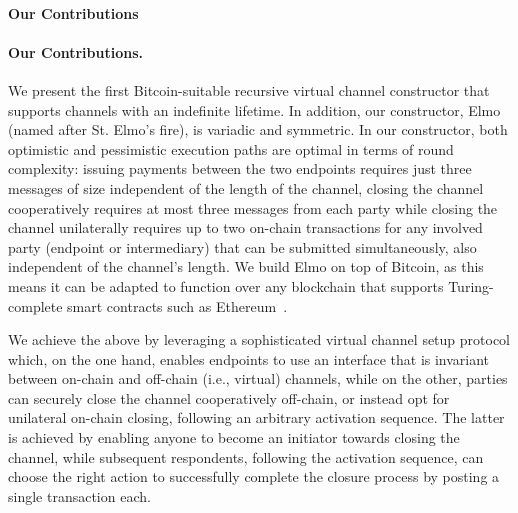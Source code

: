 \makeatletter%
%
  {\paragraph{Our Contributions}}%
  {\paragraph{Our Contributions.}}%
\makeatother%
 We present the first Bitcoin-suitable
recursive virtual channel constructor that supports channels
with an indefinite lifetime. In addition, our constructor, Elmo (named after St.
Elmo's fire), is variadic and symmetric. In our constructor, both optimistic and
pessimistic execution paths are optimal in terms of round complexity: issuing
payments between the two endpoints requires just three messages of size
independent of the length of the channel, closing the channel cooperatively
requires at most three messages from each party while
closing the channel unilaterally requires up to two on-chain transactions for
any involved party (endpoint or intermediary) that can be submitted
simultaneously, also independent of the channel's length. We build Elmo on top
of Bitcoin, as this means it can be adapted to function over any blockchain that
supports Turing-complete smart contracts such as
Ethereum~\cite{wood2014ethereum}.

We achieve the above by leveraging a sophisticated virtual channel setup
protocol which, on the one hand, enables endpoints to use an interface that is
invariant between on-chain and off-chain (i.e., virtual) channels,
while on the other, parties can securely close the channel cooperatively
off-chain, or instead opt for unilateral on-chain closing, following an arbitrary
activation sequence. The latter is achieved by enabling anyone to
become an initiator towards closing the channel, while subsequent respondents, following the activation sequence, can choose the right action to successfully complete the closure process by posting a single transaction each.

